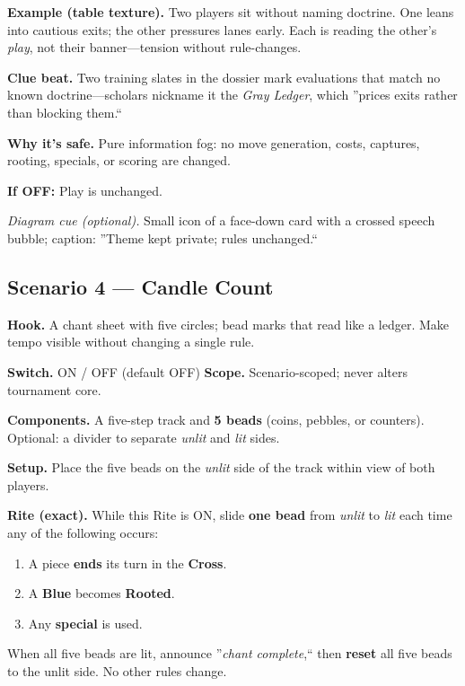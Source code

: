 \documentclass[11pt]{article}
\numberwithin{equation}{section} %
\theoremstyle{plain} %
\theoremstyle{definition} %
\theoremstyle{remark} %
\begin{document}
\medskip
\noindent\textbf{Example (table texture).}  
Two players sit without naming doctrine. One leans into cautious exits; the other pressures lanes early. Each is reading the other's \emph{play}, not their banner---tension without rule-changes.

\medskip
\noindent\textbf{Clue beat.} Two training slates in the dossier mark evaluations that match no known doctrine---scholars nickname it the \emph{Gray Ledger}, which ''prices exits rather than blocking them.``

\medskip
\noindent\textbf{Why it's safe.} Pure information fog: no move generation, costs, captures, rooting, specials, or scoring are changed.

\medskip
\noindent\textbf{If \textsc{OFF}:} Play is unchanged.

\medskip
\noindent\textit{Diagram cue (optional).} Small icon of a face-down card with a crossed speech bubble; caption: ''Theme kept private; rules unchanged.``

\subsection{Scenario 4 --- Candle Count}
\label{scen:candle-count}

\noindent\textbf{Hook.} A chant sheet with five circles; bead marks that read like a ledger. Make tempo visible without changing a single rule.

\medskip
\noindent\textbf{Switch.} \textsc{ON / OFF} (default \textsc{OFF}) \hfill \textbf{Scope.} Scenario-scoped; never alters tournament core.

\medskip
\noindent\textbf{Components.} A five-step track and \textbf{5 beads} (coins, pebbles, or counters). Optional: a divider to separate \emph{unlit} and \emph{lit} sides.

\medskip
\noindent\textbf{Setup.} Place the five beads on the \emph{unlit} side of the track within view of both players.

\medskip
\noindent\textbf{Rite (exact).} While this Rite is \textsc{ON}, slide \textbf{one bead} from \emph{unlit} to \emph{lit} each time any of the following occurs:
\begin{enumerate}\setlength\itemsep{0.2em}
  \item A piece \textbf{ends} its turn in the \textbf{Cross}.
  \item A \textbf{Blue} becomes \textbf{Rooted}.
  \item Any \textbf{special} is used.
\end{enumerate}
When all five beads are lit, announce ''\textit{chant complete},`` then \textbf{reset} all five beads to the unlit side. No other rules change.
\end{document}
